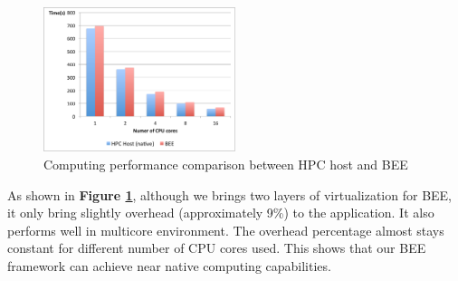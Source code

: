 \begin{figure}[h]
    \centering
    \caption{Computing performance comparison between HPC host and BEE}
    \label{comp-test}
    \includegraphics[width=0.5\textwidth]{figures/lu.pdf}
\end{figure}
 As shown in \textbf{Figure \ref{comp-test}}, although we brings two layers of virtualization for BEE, it only bring slightly overhead (approximately 9\%) to the application. It also performs well in multicore environment. The overhead percentage almost stays constant for different number of CPU cores used. This shows that our BEE framework can achieve near native computing capabilities. 
